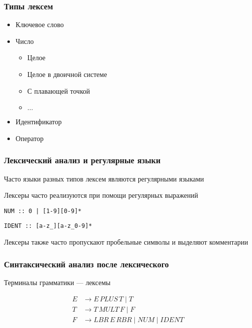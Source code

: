 \documentclass{beamer}
\begin{document}
\begin{frame}[fragile]
  \frametitle{Типы лексем}
  \begin{itemize}
    \item Ключевое слово
    \item Число
    \begin{itemize}
      \item Целое
      \item Целое в двоичной системе
      \item С плавающей точкой
      \item $\dots$
    \end{itemize}
    \item Идентификатор
    \item Оператор
  \end{itemize}
\end{frame}

\begin{frame}[fragile]
  \frametitle{Лексический анализ и регулярные языки}

  Часто языки разных типов лексем являются регулярными языками

  \bigskip

  Лексеры часто реализуются при помощи регулярных выражений

  \bigskip

  \verb!NUM :: 0 | [1-9][0-9]*!

  \verb!IDENT :: [a-z_][a-z_0-9]*!

  \bigskip

  Лексеры также часто пропускают пробельные символы и выделяют комментарии
\end{frame}


\begin{frame}[fragile]
  \frametitle{Синтаксический анализ после лексического}

  \begin{center}
    Терминалы грамматики --- лексемы
  \end{center}

  \begin{align*}
    E &\to E \, PLUS \, T \mid T  \\
    T &\to T \, MULT \, F \mid F  \\
    F &\to LBR \, E \, RBR \mid NUM \mid IDENT \\
  \end{align*}

\end{frame}
\end{document}
